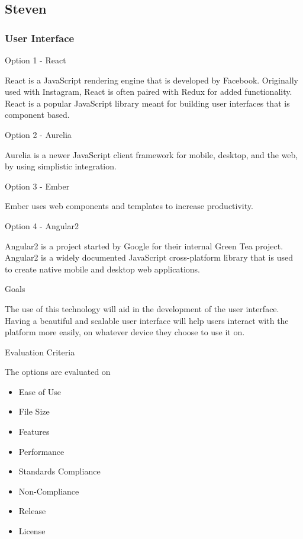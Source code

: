 \documentclass[letterpaper, 10pt, draftclsnofoot, compsoc, onecolumn]{IEEEtran}
\begin{document}
\subsection{Steven}
\vspace{1pc}

{\subsubsection{User Interface}
{\noindent Option 1 - React \cite{React} \par}
{\noindent React is a JavaScript rendering engine that is developed by Facebook. Originally used with Instagram, React is often paired with Redux for added functionality. React is a popular JavaScript library meant for building user interfaces that is component based. \par}

\medskip
{\noindent Option 2 - Aurelia \cite{Aurelia} \par}
{\noindent Aurelia is a newer JavaScript client framework for mobile, desktop, and the web, by using simplistic integration.  \par}

\medskip
{\noindent Option 3 - Ember \cite{Ember} \par}
{\noindent Ember uses web components and templates to increase productivity.  \par}

\medskip
{\noindent Option 4 - Angular2 \cite{Angular2} \par}
{\noindent Angular2 is a project started by Google for their internal Green Tea project. Angular2 is a widely documented JavaScript cross-platform library that is used to create native mobile and desktop web applications. \par}

\medskip
{\noindent Goals \par}
{\noindent The use of this technology will aid in the development of the user interface. Having a beautiful and scalable user interface will help users interact with the platform more easily, on whatever device they choose to use it on. \par}

\medskip
\newpage
{\noindent Evaluation Criteria \par}
{\noindent The options are evaluated on 

\begin{itemize}
\item Ease of Use
\item File Size
\item Features
\item Performance
\item Standards Compliance
\item Non-Compliance
\item Release 
\item License
\end{itemize}

}}
\end{document}
